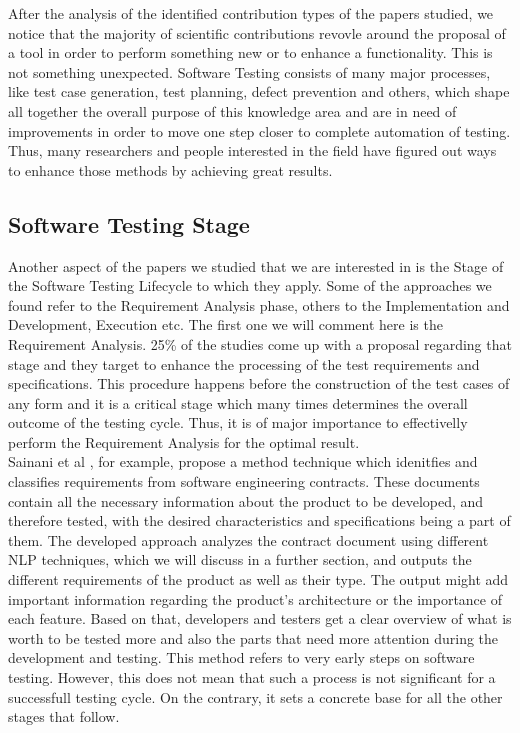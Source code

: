 After the analysis of the identified contribution types of the papers studied, we notice that the majority of scientific contributions revovle around 
the proposal of a tool in order to perform something new or to enhance a functionality. This is not something unexpected. Software Testing consists of many major processes, like 
test case generation, test planning, defect prevention and others, which shape all together the overall purpose of this knowledge area and are in need of improvements in order to move one step 
closer to complete automation of testing. Thus, many researchers and people interested in the field have figured out ways to enhance those methods by achieving great results.

\subsection {Software Testing Stage}
Another aspect of the papers we studied that we are interested in is the Stage of the Software Testing Lifecycle to which they apply. Some of the approaches we found refer to 
the Requirement Analysis phase, others to the Implementation and Development, Execution etc. The first one we will comment here is the Requirement Analysis. 25\% of the studies 
come up with a proposal regarding that stage and they target to enhance the processing of the test requirements and specifications. This procedure happens before the construction 
of the test cases of any form and it is a critical stage which many times determines the overall outcome of the testing cycle. Thus, it is of major importance to effectivelly 
perform the Requirement Analysis for the optimal result. \\

Sainani et al \cite{reqclass}, for example, propose a method technique which idenitfies and classifies requirements from software engineering contracts. These documents contain all 
the necessary information about the product to be developed, and therefore tested, with the desired characteristics and specifications being a part of them. The developed approach 
analyzes the contract document using different NLP techniques, which we will discuss in a further section, and outputs the different requirements of the product as well as their type. 
The output might add important information regarding the product's architecture or the importance of each feature. Based on that, developers and testers get a clear overview of what 
is worth to be tested more and also the parts that need more attention during the development and testing. This method refers to very early steps on software testing. However, 
this does not mean that such a process is not significant for a successfull testing cycle. On the contrary, it sets a concrete base for all the other stages that follow. \\

